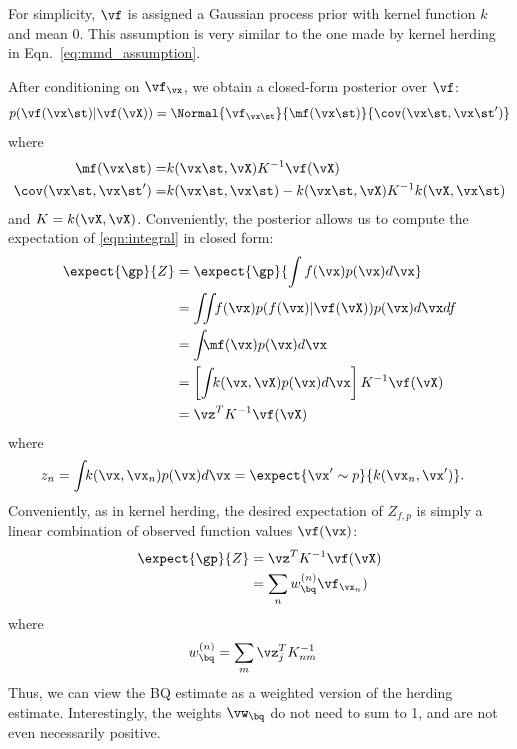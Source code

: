 For simplicity, $\vf$ is assigned a Gaussian process prior with kernel function $k$ and mean $0$.  This assumption is very similar to the one made by kernel herding in Eqn.\ \eqref{eq:mmd_assumption}.

After conditioning on $\vf_{\vx}$, we obtain a closed-form posterior over $\vf$:
%
\begin{align}
	p(\vf(\vx\st)|\vf(\vX)) = \Normal{\vf_{\vx\st}}{\mf(\vx\st)}{\cov(\vx\st,\vx\st')}
\end{align} 
where
\begin{align}
	\mf(\vx\st) = & k(\vx\st, \vX) K^{-1} \vf(\vX) \\
	\cov(\vx\st, \vx\st') = & k(\vx\st,\vx\st) - k(\vx\st, \vX) K^{-1} k(\vX, \vx\st)
\end{align} 
%
and $K = k(\vX, \vX)$. 
%
Conveniently, the \gp{} posterior allows us to compute the expectation of \eqref{eqn:integral} in closed form: 
%
\begin{align}
	\expect{\gp}{Z} & = \expect{\gp}{\int f(\vx)p(\vx)d\vx}\\
	 & = \int\!\!\! \int\!\! f(\vx) p(f(\vx)|\vf(\vX)) p(\vx) d\vx df\\
	 & = \int\!\!\! \mf(\vx) p(\vx) d\vx \\
	 & = \left[ \int\!\! k(\vx, \vX) p(\vx) d\vx \right] K^{-1} \vf(\vX) \\
	 & = \vz^T K^{-1} \vf(\vX)
	\label{eq:marg_mean_symbolic}
\end{align} 
where
\begin{align}
z_n & = \int\!\! k(\vx, \vx_n) p(\vx) d\vx = \expect{\vx' \sim p}{k(\vx_n, \vx')}.
\end{align}
%
Conveniently, as in kernel herding, the desired expectation of $Z_{f,p}$ is simply a linear combination of observed function values $\vf(\vx)$:
%
\begin{align}
	\expect{\gp}{Z} & = \vz^T K^{-1} \vf(\vX) \\
		& = \sum_n w_{\bq}^{(n)} \vf_{\vx_n})
\end{align}  
where
\begin{align}  
	w_{\bq}^{(n)} & = \sum_m \vz_j^T K^{-1}_{nm}
	\label{eq:bq_weights}
\end{align}
%
Thus, we can view the BQ estimate as a weighted version of the herding estimate.  Interestingly, the weights $\vw_{\bq}$ do not need to sum to 1, and are not even necessarily positive.

